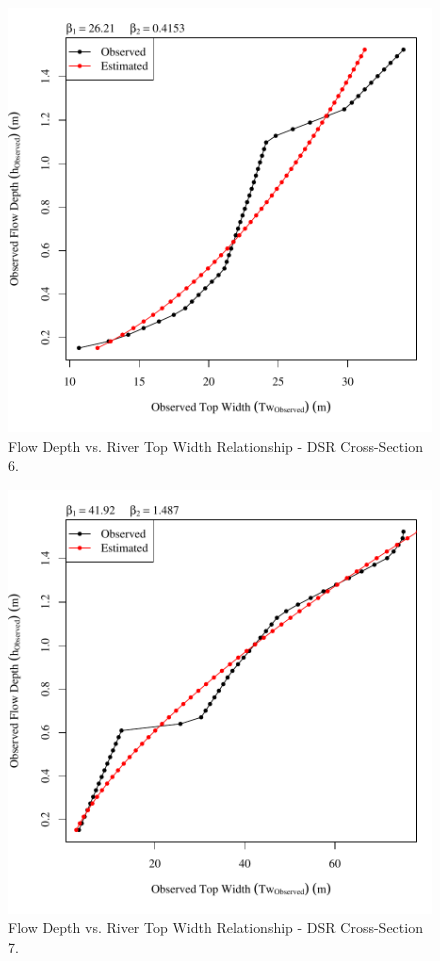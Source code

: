 \begin{center}
\begin{figure}[htbp]
	\includegraphics[width=6in]{"Figures/Results_DSR/Survey Tw vs H-Section 6"}
	\caption{Flow Depth vs. River Top Width Relationship - DSR Cross-Section 6.}
\end{figure}
\end{center}
\newpage

\begin{center}
\begin{figure}[htbp]
	\includegraphics[width=6in]{"Figures/Results_DSR/Survey Tw vs H-Section 7"}
	\caption{Flow Depth vs. River Top Width Relationship - DSR Cross-Section 7.}
\end{figure}
\end{center}
\newpage

